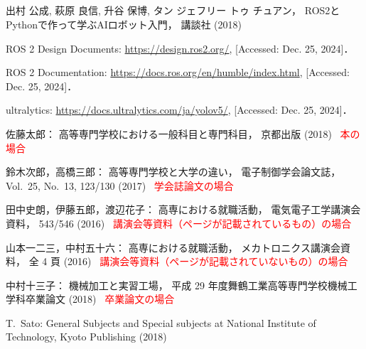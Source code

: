 \begin{center}
	\section*{}                      %
	\vspace*{-2zh}
\end{center}

\begin{thebibliography}{99}
	
	出村 公成, 萩原 良信, 升谷 保博, タン ジェフリー トゥ チュアン，
	ROS2とPythonで作って学ぶAIロボット入門，
	講談社 (2018)
	
	ROS 2 Design Documents: \url{https://design.ros2.org/}, [Accessed: Dec. 25, 2024]．
	
	ROS 2 Documentation: \url{https://docs.ros.org/en/humble/index.html}, [Accessed: Dec. 25, 2024]．
	
	ultralytics: \url{https://docs.ultralytics.com/ja/yolov5/}, [Accessed: Dec. 25, 2024]．
	
	佐藤太郎：
	高等専門学校における一般科目と専門科目，
	京都出版 (2018)
	\textcolor{red}{\quad\cdotfill\ 本の場合}
	
	鈴木次郎，高橋三郎：
	高等専門学校と大学の違い，
	電子制御学会論文誌，
	Vol.~25, No.~13, 123/130 (2017)
	\textcolor{red}{\quad\cdotfill\ 学会誌論文の場合}
	
	田中史朗，伊藤五郎，渡辺花子：
	高専における就職活動，
	電気電子工学講演会資料，
	543/546 (2016)
	\textcolor{red}{\quad\cdotfill\ 講演会等資料（ページが記載されているもの）の場合}
	
	山本一二三，中村五十六：
	高専における就職活動，
	メカトロニクス講演会資料，
	全 4 頁 (2016)
	\textcolor{red}{\quad\cdotfill\ 講演会等資料（ページが記載されていないもの）の場合}
	
	中村十三子：
	機械加工と実習工場，
	平成 29 年度舞鶴工業高等専門学校機械工学科卒業論文 (2018)
	\textcolor{red}{\quad\cdotfill\ 卒業論文の場合}
	
	T.~Sato: 
	General Subjects and Special subjects at National Institute of Technology, 
	Kyoto Publishing (2018)
	

\end{thebibliography}
